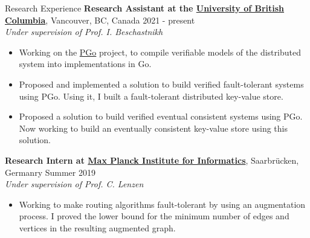 \documentclass{resume} %
\begin{document}
\begin{rSection}{Research Experience}
	{\bf Research Assistant at the \href{https://www.ubc.ca/}{University of British Columbia}},
        {Vancouver, BC, Canada \hfill 2021 - present}
	\\ \textit{Under supervision of Prof. I. Beschastnikh} \smallskip
	\vspace{-0.5em}
	\begin{itemize}[leftmargin=3mm]
		\setlength{\itemsep}{1pt}
		\setlength{\parskip}{0pt}
		\setlength{\parsep}{0pt}
		\renewcommand\labelitemi{$\cdot$}

		\item Working on the \href{https://github.com/UBC-NSS/pgo}{PGo} project,
            to compile verifiable models of the distributed system into implementations
            in Go.
		\item Proposed and implemented a solution to build verified fault-tolerant
            systems using PGo. Using it, I built a fault-tolerant distributed
            key-value store.
		\item Proposed a solution to build verified eventual consistent systems using PGo.
            Now working to build an eventually consistent key-value store using this solution.
	\end{itemize}

	{\bf Research Intern at \href{https://www.mpi-inf.mpg.de/}{Max Planck Institute for Informatics}}, {Saarbr{\"u}cken, Germanry \hfill Summer 2019}
	\\ \textit{Under supervision of Prof. C. Lenzen} \smallskip
	\vspace{-0.5em}
	\begin{itemize}[leftmargin=3mm]
		\setlength{\itemsep}{1pt}
		\setlength{\parskip}{0pt}
		\setlength{\parsep}{0pt}
		\renewcommand\labelitemi{$\cdot$}

		\item Working to make routing algorithms fault-tolerant by using an augmentation 
            process. I proved the lower bound for the minimum number of edges 
		    and vertices in the resulting augmented graph.
	\end{itemize}
\end{rSection}

\end{document}
